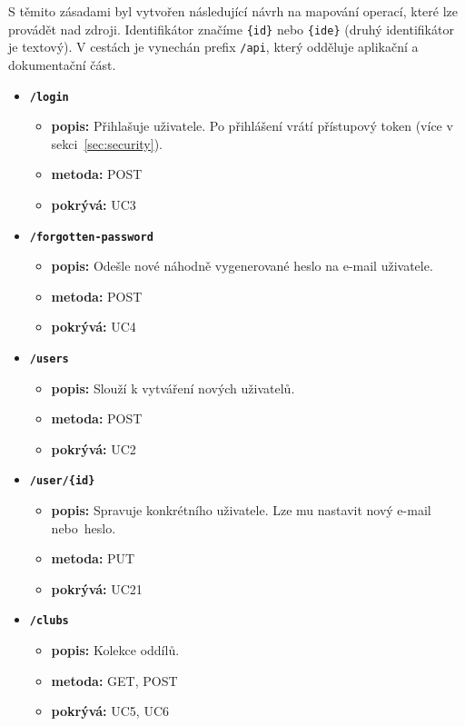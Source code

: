 S těmito zásadami byl vytvořen následující návrh na mapování operací, které lze provádět nad zdroji.
Identifikátor značíme \texttt{\{id\}} nebo \texttt{\{ide\}} (druhý identifikátor je textový).
V cestách je vynechán prefix \texttt{/api}, který odděluje aplikační a dokumentační část.

\begin{itemize}
  \item \texttt{\textbf{/login}}
  \begin{itemize}
    \item \textbf{popis:} Přihlašuje uživatele. Po přihlášení vrátí přístupový token (více v sekci~\ref{sec:security}).
    \item \textbf{metoda:} POST
    \item \textbf{pokrývá:} UC3
  \end{itemize}
  \item \texttt{\textbf{/forgotten-password}}
  \begin{itemize}
    \item \textbf{popis:} Odešle nové náhodně vygenerované heslo na e-mail uživatele.
    \item \textbf{metoda:} POST
    \item \textbf{pokrývá:} UC4
  \end{itemize}
  \item \texttt{\textbf{/users}}
  \begin{itemize}
    \item \textbf{popis:} Slouží k vytváření nových uživatelů.
    \item \textbf{metoda:} POST
    \item \textbf{pokrývá:} UC2
  \end{itemize}
  \item \texttt{\textbf{/user/\{id\}}}
  \begin{itemize}
    \item \textbf{popis:} Spravuje konkrétního uživatele. Lze mu nastavit nový e-mail nebo~heslo.
    \item \textbf{metoda:} PUT
    \item \textbf{pokrývá:} UC21
  \end{itemize}
  \pagebreak
  \item \texttt{\textbf{/clubs}}
  \begin{itemize}
    \item \textbf{popis:} Kolekce oddílů.
    \item \textbf{metoda:} GET, POST
    \item \textbf{pokrývá:} UC5, UC6

\end{itemize}
\end{itemize}
